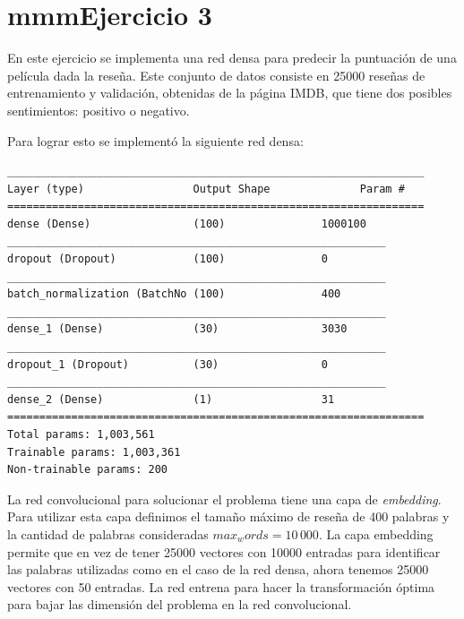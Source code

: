 \section*{mmmEjercicio 3}

En este ejercicio se implementa  una red densa para predecir la puntuación de una película dada la reseña. Este conjunto de datos consiste en 25000 reseñas de entrenamiento y validación, obtenidas de la página IMDB, que tiene dos posibles sentimientos: positivo o negativo.

Para lograr esto se implementó la siguiente red densa:

\begin{verbatim}
_________________________________________________________________
Layer (type)                 Output Shape              Param #   
=================================================================
dense (Dense)                (100)               1000100   
___________________________________________________________
dropout (Dropout)            (100)               0         
___________________________________________________________
batch_normalization (BatchNo (100)               400       
___________________________________________________________
dense_1 (Dense)              (30)                3030      
___________________________________________________________
dropout_1 (Dropout)          (30)                0         
___________________________________________________________
dense_2 (Dense)              (1)                 31        
=================================================================
Total params: 1,003,561
Trainable params: 1,003,361
Non-trainable params: 200

\end{verbatim}


La red convolucional para solucionar el problema tiene una capa de \emph{embedding}. Para utilizar esta capa definimos el tamaño máximo de reseña de 400 palabras y la cantidad de palabras consideradas $max_words=10\,000$. La capa embedding permite que en vez de tener 25000 vectores con 10000 entradas para identificar las palabras utilizadas como en el caso de la red densa, ahora tenemos 25000 vectores con 50  entradas. La red entrena para hacer la transformación óptima para bajar las dimensión del problema en la red convolucional.

